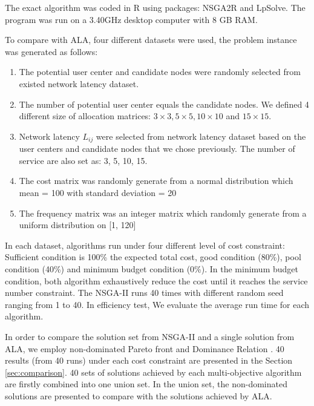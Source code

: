 \documentclass{llncs}
\begin{document}
The exact algorithm was coded in R using packages: NSGA2R and LpSolve. The program was run on a 3.40GHz 
desktop computer with 8 GB RAM.

To compare with ALA, four different datasets were used, the problem instance was generated as follows:
\begin{enumerate}
	\item The potential user center and candidate nodes were randomly selected from existed network latency dataset. 
	\item The number of potential user center equals the candidate nodes. We defined 4 different size of allocation matrices:
			$3 \times 3, 5 \times 5, 10 \times 10$ and $15 \times 15$.
	\item Network latency $L_{ij}$ were selected from network latency dataset based on the user centers and candidate nodes that
		we chose previously. The number of service are also set as: 3, 5, 10, 15.
	\item The cost matrix was randomly generate from a normal distribution which mean = 100 with standard deviation = 20
	\item The frequency matrix was an integer matrix which randomly generate from a uniform distribution on [1, 120]
\end{enumerate}

In each dataset, algorithms run under four different level of cost constraint: Sufficient condition is 100\% the expected total cost, 
good condition (80\%), pool condition (40\%) and minimum budget condition (0\%). In the minimum budget condition, both algorithm exhaustively reduce the cost until it reaches the service number constraint. The NSGA-II runs 40 times with different random 
seed ranging from 1 to 40. In efficiency test, We evaluate the average run time for each algorithm. 

In order to compare the solution set from  NSGA-II and a single solution from ALA, we employ non-dominated Pareto front
\cite{Xue} and Dominance Relation \cite{1688438}.
40 results (from 40 runs) under each cost constraint are presented in the Section \ref{sec:comparison}. 40 sets of solutions 
achieved by each multi-objective algorithm are firstly combined into one union set. In the union set, the non-dominated solutions 
are presented to compare with the solutions achieved by ALA.
\end{document}
